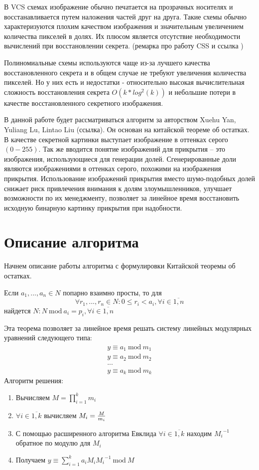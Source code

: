 \documentclass[a4paper,article,14pt]{extarticle}
\newcommand{\Mod}[1]{\ \mathrm{mod}\ #1}
\begin{document}
В VCS схемах изображение обычно печатается на прозрачных носителях и восстанавливается путем наложения частей друг на друга. Такие 
схемы обычно характеризуются плохим качеством изображения и значительным увеличением количества пикселей в долях. Их плюсом является
отсутствие необходимости вычислений при восстановлении секрета. (ремарка про работу CSS и ссылка )

Полиномиальные схемы используются чаще из-за лучшего качества восстановленного секрета и в общем случае 
не требуют увеличения количества пикселей. Но у них есть и недостатки - относительно высокая вычислительная сложность 
восстановления секрета $O(k*log^2(k))$ и небольшие потери в качестве восстановленного секретного изображения.

В данной работе будет рассматриваться алгоритм за авторством Xuehu Yan, Yuliang Lu, Lintao Liu (ссылка). Он основан на китайской 
теореме об остатках. В качестве секретной картинки выступает изображение в оттенках серого $(0-255)$.
Так же вводится понятие изображений для прикрытия -- это изображения, использующиеся для генерации долей. Сгенерированные доли 
являются изображениями в оттенках серого, похожими на изображения прикрытия. Использование изображений прикрытия 
вместо шумо-подобных долей снижает риск привлечения внимания к долям злоумышленников, улучшает возможности 
по их менеджменту, позволяет за линейное время восстановить исходную бинарную картинку прикрытия при надобности. 

\newpage
\section{Описание алгоритма}
Начнем описание работы алгоритма с формулировки Китайской теоремы об остатках.

Если $ a_1,...,a_n \in N $ попарно взаимно просты, то для 
$$\forall r_1,...,r_n \in N : 0\leq r_i<a_i, \forall i\in \overline{1,n}$$
найдется $N: N \Mod a_i = p_i, \forall i\in \overline{1,n}$ 

Эта теорема позволяет за линейное время решать систему линейных модулярных уравнений следующего типа:
\begin{gather}
    y \equiv a_1 \Mod m_1 \\
    y \equiv a_2 \Mod m_2 \\
    ... \\
    y \equiv a_k \Mod m_k
\end{gather}
Алгоритм решения:
\begin{enumerate}
    \item Вычисляем $M=\prod\limits_{i = 1}^k m_i$
    \item $\forall i\in \overline{1,k}$ вычисляем $M_i={{M} \over {m_i}}$
    \item С помощью расширенного алгоритма Евклида $\forall i\in \overline{1,k}$ находим ${M_i}^{-1}$ обратное по модулю для $M_i$
    \item Получаем $y \equiv \sum\limits_{i=1}^k a_i M_i {M_i}^{-1} \Mod M$
\end{enumerate}
\end{document}
